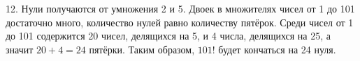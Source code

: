 12. Нули получаются от умножения 2 и 5. Двоек в множителях чисел от 1 до 101 достаточно много, количество нулей равно количеству пятёрок. Среди чисел от 1 до 101 содержится 20 чисел, делящихся на 5, и 4 числа, делящихся на 25, а значит $20+4=24$ пятёрки. Таким образом, $101!$ будет кончаться на 24 нуля.\\
